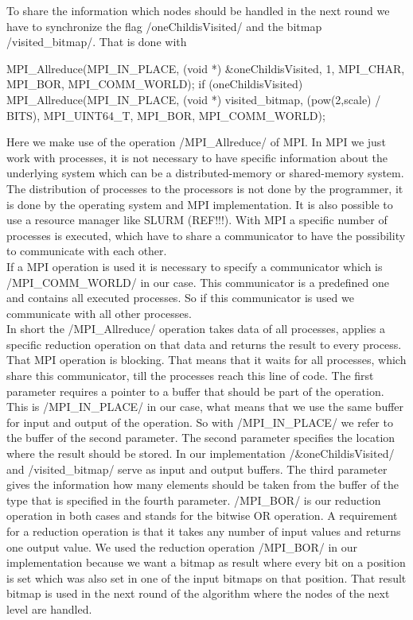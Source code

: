 \documentclass[12pt,a4paper]{article}
\begin{document}
To share the information which nodes should be handled in the next round we have to synchronize the flag \cinline/oneChildisVisited/ and the bitmap \cinline/visited_bitmap/. That is done with
\begin{ccode}
MPI_Allreduce(MPI_IN_PLACE, (void *) &oneChildisVisited, 1, MPI_CHAR, MPI_BOR, MPI_COMM_WORLD);        
if (oneChildisVisited){
        MPI_Allreduce(MPI_IN_PLACE, (void *) visited_bitmap, (pow(2,scale) / BITS), MPI_UINT64_T, MPI_BOR, MPI_COMM_WORLD);
}
\end{ccode}
Here we make use of the operation \cinline/MPI_Allreduce/ of MPI. In MPI we just work with processes, it is not necessary to have specific information about the underlying system which can be a distributed-memory or shared-memory system. The distribution of processes to the processors is not done by the programmer, it is done by the operating system and MPI implementation. It is also possible to use a resource manager like SLURM (REF!!!). With MPI a specific number of processes is executed, which have to share a communicator to have the possibility to communicate with each other.\\
If a MPI operation is used it is necessary to specify a communicator which is \cinline/MPI_COMM_WORLD/ in our case. This communicator is a predefined one and contains all executed processes. So if this communicator is used we communicate with all other processes.\\
In short the \cinline/MPI_Allreduce/ operation takes data of all processes, applies a specific reduction operation on that data and returns the result to every process. That MPI operation is blocking. That means that it waits for all processes, which share this communicator, till the processes reach this line of code. The first parameter requires a pointer to a buffer that should be part of the operation. This is \cinline/MPI_IN_PLACE/ in our case, what means that we use the same buffer for input and output of the operation. So with \cinline/MPI_IN_PLACE/ we refer to the buffer of the second parameter. The second parameter specifies the location where the result should be stored. In our implementation \cinline/&oneChildisVisited/ and \cinline/visited_bitmap/ serve as input and output buffers. The third parameter gives the information how many elements should be taken from the buffer of the type that is specified in the fourth parameter. \cinline/MPI_BOR/ is our reduction operation in both cases and stands for the bitwise OR operation. A requirement for a reduction operation is that it takes any number of input values and returns one output value. We used the reduction operation \cinline/MPI_BOR/ in our implementation because we want a bitmap as result where every bit on a position is set which was also set in one of the input bitmaps on that position. That result bitmap is used in the next round of the algorithm where the nodes of the next level are handled.
\end{document}
